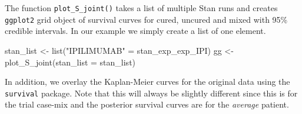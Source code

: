 \documentclass[
]{article}
\newenvironment{Shaded}{\begin{snugshade}}{\end{snugshade}}
\newcommand{\AttributeTok}[1]{\textcolor[rgb]{0.77,0.63,0.00}{#1}}
\newcommand{\FunctionTok}[1]{\textcolor[rgb]{0.00,0.00,0.00}{#1}}
\newcommand{\NormalTok}[1]{#1}
\newcommand{\OtherTok}[1]{\textcolor[rgb]{0.56,0.35,0.01}{#1}}
\newcommand{\StringTok}[1]{\textcolor[rgb]{0.31,0.60,0.02}{#1}}
\begin{document}
The function \texttt{plot\_S\_joint()} takes a list of multiple Stan
runs and creates \texttt{ggplot2} grid object of survival curves for
cured, uncured and mixed with 95\% credible intervals. In our example we
simply create a list of one element.

\begin{Shaded}
\begin{Highlighting}[]
\NormalTok{stan\_list }\OtherTok{\textless{}{-}} \FunctionTok{list}\NormalTok{(}\StringTok{"IPILIMUMAB"} \OtherTok{=}\NormalTok{ stan\_exp\_exp\_IPI)}
\NormalTok{gg }\OtherTok{\textless{}{-}} \FunctionTok{plot\_S\_joint}\NormalTok{(}\AttributeTok{stan\_list =}\NormalTok{ stan\_list)}
\end{Highlighting}
\end{Shaded}

In addition, we overlay the Kaplan-Meier curves for the original data
using the \texttt{survival} package. Note that this will always be
slightly different since this is for the trial case-mix and the
posterior survival curves are for the \emph{average} patient.
\end{document}
